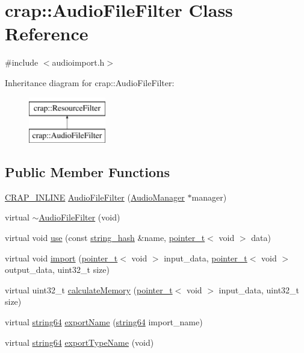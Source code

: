 \hypertarget{classcrap_1_1_audio_file_filter}{\section{crap\+:\+:Audio\+File\+Filter Class Reference}
\label{classcrap_1_1_audio_file_filter}
}


{\ttfamily \#include $<$audioimport.\+h$>$}

Inheritance diagram for crap\+:\+:Audio\+File\+Filter\+:\begin{figure}[H]
\begin{center}
\leavevmode
\includegraphics[height=2.000000cm]{classcrap_1_1_audio_file_filter}
\end{center}
\end{figure}
\subsection*{Public Member Functions}
\begin{DoxyCompactItemize}
\item 
\hyperlink{config__x86_8h_a5a40526b8d842e7ff731509998bb0f1c}{C\+R\+A\+P\+\_\+\+I\+N\+L\+I\+N\+E} \hyperlink{classcrap_1_1_audio_file_filter_ac425c182077ddaf689c3fb507cbbed9a}{Audio\+File\+Filter} (\hyperlink{classcrap_1_1_audio_manager}{Audio\+Manager} $\ast$manager)
\item 
virtual \hyperlink{classcrap_1_1_audio_file_filter_a497f1948321e9693a35504e5414e7c22}{$\sim$\+Audio\+File\+Filter} (void)
\item 
virtual void \hyperlink{classcrap_1_1_audio_file_filter_aba3859aed6fe298b9b9f3355d55e4681}{use} (const \hyperlink{classcrap_1_1string__hash}{string\+\_\+hash} \&name, \hyperlink{structcrap_1_1pointer__t}{pointer\+\_\+t}$<$ void $>$ data)
\item 
virtual void \hyperlink{classcrap_1_1_audio_file_filter_a3d908e1de624fa11b50579aec91f9390}{import} (\hyperlink{structcrap_1_1pointer__t}{pointer\+\_\+t}$<$ void $>$ input\+\_\+data, \hyperlink{structcrap_1_1pointer__t}{pointer\+\_\+t}$<$ void $>$ output\+\_\+data, uint32\+\_\+t size)
\item 
virtual uint32\+\_\+t \hyperlink{classcrap_1_1_audio_file_filter_aa72252d9d5d4712c1e9a7118d35978b1}{calculate\+Memory} (\hyperlink{structcrap_1_1pointer__t}{pointer\+\_\+t}$<$ void $>$ input\+\_\+data, uint32\+\_\+t size)
\item 
virtual \hyperlink{namespacecrap_a2b8a7358804e1a9c3c32f12d8cdcfdf8}{string64} \hyperlink{classcrap_1_1_audio_file_filter_a3a5390867a59a54da2eaf61e0a28b25d}{export\+Name} (\hyperlink{namespacecrap_a2b8a7358804e1a9c3c32f12d8cdcfdf8}{string64} import\+\_\+name)
\item 
virtual \hyperlink{namespacecrap_a2b8a7358804e1a9c3c32f12d8cdcfdf8}{string64} \hyperlink{classcrap_1_1_audio_file_filter_ad33c23c9538347df97c9de4828bf9465}{export\+Type\+Name} (void)
\end{DoxyCompactItemize}

